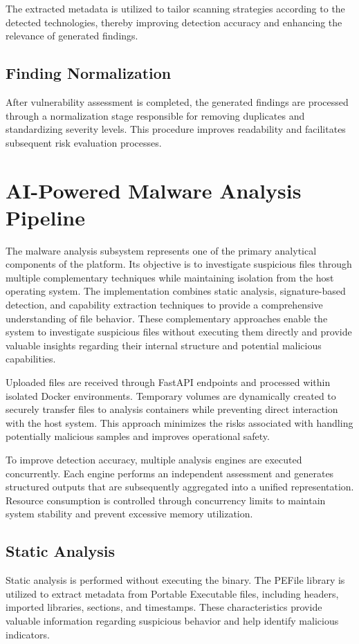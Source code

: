 The extracted metadata is utilized to tailor scanning strategies according to the detected technologies, thereby improving detection accuracy and enhancing the relevance of generated findings.

\subsection{Finding Normalization}
After vulnerability assessment is completed, the generated findings are processed through a normalization stage responsible for removing duplicates and standardizing severity levels. This procedure improves readability and facilitates subsequent risk evaluation processes.

\section{AI-Powered Malware Analysis Pipeline}
The malware analysis subsystem represents one of the primary analytical components of the platform. Its objective is to investigate suspicious files through multiple complementary techniques while maintaining isolation from the host operating system. The implementation combines static analysis, signature-based detection, and capability extraction techniques to provide a comprehensive understanding of file behavior. These complementary approaches enable the system to investigate suspicious files without executing them directly and provide valuable insights regarding their internal structure and potential malicious capabilities.

Uploaded files are received through FastAPI endpoints and processed within isolated Docker environments. Temporary volumes are dynamically created to securely transfer files to analysis containers while preventing direct interaction with the host system. This approach minimizes the risks associated with handling potentially malicious samples and improves operational safety.

To improve detection accuracy, multiple analysis engines are executed concurrently. Each engine performs an independent assessment and generates structured outputs that are subsequently aggregated into a unified representation. Resource consumption is controlled through concurrency limits to maintain system stability and prevent excessive memory utilization.

\subsection{Static Analysis}
Static analysis is performed without executing the binary. The PEFile library is utilized to extract metadata from Portable Executable files, including headers, imported libraries, sections, and timestamps. These characteristics provide valuable information regarding suspicious behavior and help identify malicious indicators.

